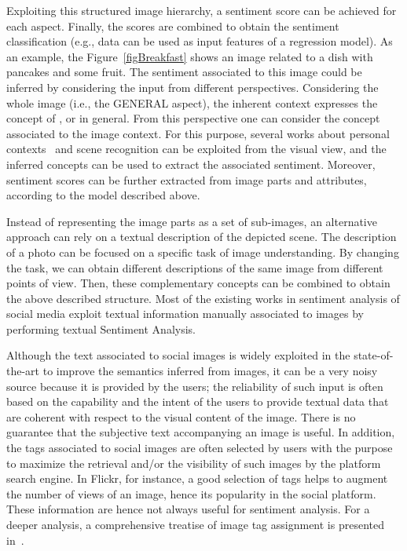 Exploiting this structured image hierarchy, a sentiment score can be achieved for each aspect. Finally, the scores are combined to obtain the sentiment classification (e.g., data can be used as input features of a regression model).
As an example, the Figure~\ref{figBreakfast} shows an image related to a dish with pancakes and some fruit. The sentiment associated to this image could be inferred by considering the input from different perspectives. Considering the whole image (i.e., the GENERAL aspect), the inherent context expresses the concept of , or  in general. From this perspective one can consider the concept associated to the image context. For this purpose, several works about personal contexts~\cite{ORTIS2017207,furnari2018personal} and scene recognition can be exploited from the visual view, and the inferred concepts can be used to extract the associated sentiment. Moreover, sentiment scores can be further extracted from image parts and attributes, according to the model described above.

Instead of representing the image parts as a set of sub-images, an alternative approach can rely on a textual description of the depicted scene. The description of a photo can be focused on a specific task of image understanding. By changing the task, we can obtain different descriptions of the same image from different points of view. Then, these complementary concepts can be combined to obtain the above described structure.
Most of the existing works in sentiment analysis of social media exploit textual information manually associated to images by performing textual Sentiment Analysis.%

Although the text associated to social images is widely exploited in the state-of-the-art to improve the semantics inferred from images, it can be a very noisy source because it is provided by the users; the reliability of such input is often based on the capability and the intent of the users to provide textual data that are coherent with respect to the visual content of the image. There is no guarantee that the subjective text accompanying an image is useful.  %
In addition, the tags associated to social images are often selected by users with the purpose to maximize the retrieval and/or the visibility of such images by the platform search engine. In Flickr, for instance, a good selection of tags helps to augment the number of views of an image, hence its popularity in the social platform.
These information are hence not always useful for sentiment analysis.
For a deeper analysis, a comprehensive treatise of image tag assignment is presented in~\cite{li2016socializing}.

